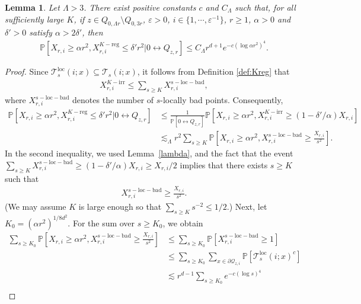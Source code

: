 \documentclass[11pt]{article}
\theoremstyle{definition}
\theoremstyle{remark}
\newcommand{\bP}{\mathbb{P}}
\numberwithin{equation}{section}
\theoremstyle{plain}
\newtheorem{lem}[theorem]{Lemma}
\theoremstyle{definition}
\theoremstyle{remark}
\theoremstyle{plain}
\begin{document}
\begin{lem}\label{Kregpoint}
Let $\Lambda>3$. There exist positive constants $c$ and $C_{\Lambda}$ such that, for all sufficiently large $K$, if $z \in Q_{0,\Lambda r}\setminus Q_{0,3r}$, $\varepsilon>0$,  $i \in \{1, \cdots, \varepsilon^{-1}\}$, $r\geq1$, $\alpha>0$ and $\delta'>0$ satisfy $\alpha>2\delta'$, then
    \begin{align*}
        \bP[X_{r,i}\ge \alpha r^2,X_{r,i}^{K-\mathrm{reg}}\le \delta' r^2 | 0 \leftrightarrow Q_{z,r}]\le C_{\Lambda}r^{d+1}e^{-c(\log \alpha r^2)^4}.
    \end{align*}
\end{lem}
\begin{proof}Since $\mathcal T_{s}^{\mathrm{loc}}(i;x)\subseteq \mathcal T_{s}(i;x)$, it follows from Definition \ref{def:Kreg} that
\begin{align*}
    X_{r,i}^{K-\mathrm{irr}}\le \sum_{s\ge K}X_{r,i}^{s-\mathrm{loc-bad}},
\end{align*}
where $X_{r,i}^{s-\mathrm{loc-bad}}$ denotes the number of $s$-locally bad points. Consequently,
    \begin{align*}
        \bP[X_{r,i}\ge \alpha r^2,X_{r,i}^{K-\mathrm{reg}}\le \delta' r^2 | 0 \leftrightarrow Q_{z,r}]&\le \frac{1}{ \bP[0 \leftrightarrow Q_{z,r}]} \bP[X_{r,i}\ge \alpha r^2,X_{r,i}^{K-\mathrm{irr}}\ge (1-\delta'/\alpha) X_{r,i}]\\
        &\lesssim_{\Lambda} r^2\sum_{s\ge K}\bP[X_{r,i}\ge \alpha r^2,X_{r,i}^{s-\mathrm{loc-bad}}\ge \frac{X_{r,i}}{s^2}].
    \end{align*}
In the second inequality, we used Lemma~\ref{lambda}, and the fact that the event $\sum_{s\ge K}X_{r,i}^{s-\mathrm{loc-bad}}\ge (1-\delta'/\alpha) X_{r,i}\geq X_{r,i}/2$ implies that there exists $s \ge K$ such that
  \begin{align*}
     X_{r,i}^{s-\mathrm{loc-bad}}\ge \frac{X_{r,i}}{s^2}.
  \end{align*}
(We may assume $K$ is large enough so that $\sum_{s\geq K}s^{-2}\leq 1/2$.) Next, let $K_0=(\alpha r^2)^{1/8d^2}$. For the sum over $s\ge K_0$, we obtain
  \begin{align*}
    \sum_{s\ge K_0}\bP[X_{r,i}\ge \alpha r^2,X_{r,i}^{s-\mathrm{loc-bad}}\ge \frac{X_{r,i}}{s^2}]&\le \sum_{s\ge K_0}\bP[X_{r,i}^{s-\mathrm{loc-bad}}\ge1]\\
    &\le  \sum_{s\ge K_0}\sum_{ x \in \partial \mathcal Q_{z,i}}\bP[\mathcal T_{s}^{\mathrm{loc}}(i;x)^c]\\
    &\lesssim r^{d-1}\sum_{s\ge K_0}e^{-c(\log s)^4}\\

\end{align*}
\end{proof}
\end{document}
